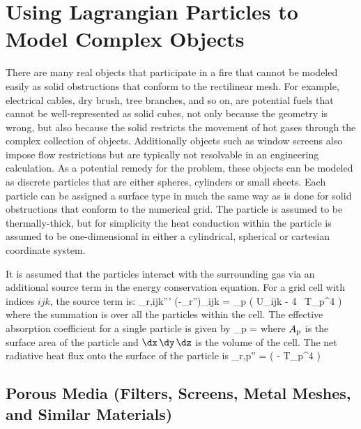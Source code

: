 \section{Using Lagrangian Particles to Model Complex Objects}
\label{rad_part_absorb}

There are many real objects that participate in a fire that cannot be modeled easily as solid obstructions that conform to the rectilinear mesh. For example, electrical cables, dry brush, tree branches, and so on, are potential fuels that cannot be well-represented as solid cubes, not only because the geometry is wrong, but also because the solid restricts the movement of hot gases through the complex collection of objects.  Additionally objects such as window screens also impose flow restrictions but are typically not resolvable in an engineering calculation. As a potential remedy for the problem, these objects can be modeled as discrete particles that are either spheres, cylinders or small sheets. Each particle can be assigned a surface type in much the same way as is done for solid obstructions that conform to the numerical grid. The particle is assumed to be thermally-thick, but for simplicity the heat conduction within the particle is assumed to be one-dimensional in either a cylindrical, spherical or cartesian coordinate system.

It is assumed that the particles interact with the surrounding gas via an additional source term in the energy conservation equation. For a grid cell with indices $ijk$, the source term is:
\be \label{eq:qr}
   \dq_{{\rm r},ijk}''' \equiv (-\nabla \cdot \dot{\bq}_{\rm r}'')_{ijk} = \sum \kappa_{\rm p} \left( U_{ijk} - 4 \sigma \, T_{\rm p}^4 \right)
\ee
where the summation is over all the particles within the cell. The effective absorption coefficient for a single particle is given by
\be
   \kappa_{\rm p} = 
\ee
where $A_{\rm p}$ is the surface area of the particle and $\dx \, \dy \, \dz$ is the volume of the cell. The net radiative heat flux onto the surface of the particle is
\be
   \dq_{\rm r,p}'' = \epsilon \left(  - \sigma T_{\rm p}^4 \right)
\ee


\subsection{Porous Media (Filters, Screens, Metal Meshes, and Similar Materials)}

